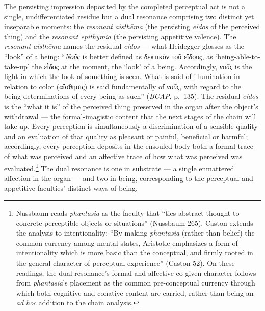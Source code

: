 \documentclass{article}
\newcommand{\gk}[1]{{\greekfont #1}}
\begin{document}
The persisting impression deposited by the completed perceptual act is not a single, undifferentiated residue but a dual resonance comprising two distinct yet inseparable moments: the \textit{resonant aisthēma} (the persisting \textit{eidos} of the perceived thing) and the \textit{resonant epithymia} (the persisting appetitive valence). The \textit{resonant aisthēma} names the residual \textit{eidos} --- what Heidegger glosses as the ``look'' of a being: ``\textit{Νοῦς} is better defined as \gk{δεκτικὸν τοῦ εἴδους}, as `being-able-to-take-up' the \gk{εἶδος} at the moment, the `look' of a being. Accordingly, \textit{νοῦς} is the light in which the look of something is seen. What is said of illumination in relation to color (\gk{αἴσθησις}) is said fundamentally of \textit{νοῦς}, with regard to the being-determinations of every being as such'' (\textit{BCAP}, p.~135). The residual \textit{eidos} is the ``what it is'' of the perceived thing preserved in the organ after the object's withdrawal --- the formal-imagistic content that the next stages of the chain will take up. Every perception is simultaneously a discrimination of a sensible quality and an evaluation of that quality as pleasant or painful, beneficial or harmful; accordingly, every perception deposits in the ensouled body both a formal trace of what was perceived and an affective trace of how what was perceived was evaluated.\footnote{Nussbaum reads \textit{phantasia} as the faculty that ``ties abstract thought to concrete perceptible objects or situations'' (Nussbaum 265). Caston extends the analysis to intentionality: ``By making \textit{phantasia} (rather than belief) the common currency among mental states, Aristotle emphasizes a form of intentionality which is more basic than the conceptual, and firmly rooted in the general character of perceptual experience'' (Caston 52). On these readings, the dual-resonance's formal-and-affective co-given character follows from \textit{phantasia}'s placement as the common pre-conceptual currency through which both cognitive and conative content are carried, rather than being an \textit{ad hoc} addition to the chain analysis.} The dual resonance is one in substrate --- a single enmattered affection in the organ --- and two in being, corresponding to the perceptual and appetitive faculties' distinct ways of being.
\end{document}
